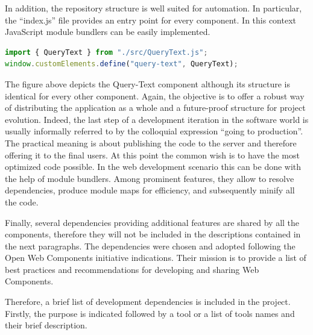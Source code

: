 In addition, the repository structure is well suited for automation. In particular, the “index.js” file provides an entry point for every component. In this context JavaScript module bundlers can be easily implemented.
\\
\begin{lstlisting}[caption={Component entry point example},label={componentEntrypoint}, language=JavaScript]
import { QueryText } from "./src/QueryText.js";
window.customElements.define("query-text", QueryText);
\end{lstlisting}

The figure above depicts the Query-Text component although its structure is identical for every other component. Again, the objective is to offer a robust way of distributing the application as a whole and a future-proof structure for project evolution. Indeed, the last step of a development iteration in the software world is usually informally referred to by the colloquial expression “going to production”. The practical meaning is about publishing the code to the server and therefore offering it to the final users. At this point the common wish is to have the most optimized code possible. In the web development scenario this can be done with the help of module bundlers. Among prominent features, they allow to resolve dependencies, produce module maps for efficiency, and subsequently minify all the code.

Finally, several dependencies providing additional features are shared by all the components, therefore they will not be included in the descriptions contained in the next paragraphs. The dependencies were chosen and adopted following the Open Web Components initiative indications. Their mission is to provide a list of best practices and recommendations for developing and sharing Web Components.

Therefore, a brief list of development dependencies is included in the project. Firstly, the purpose is indicated followed by a tool or a list of tools names and their brief description.

